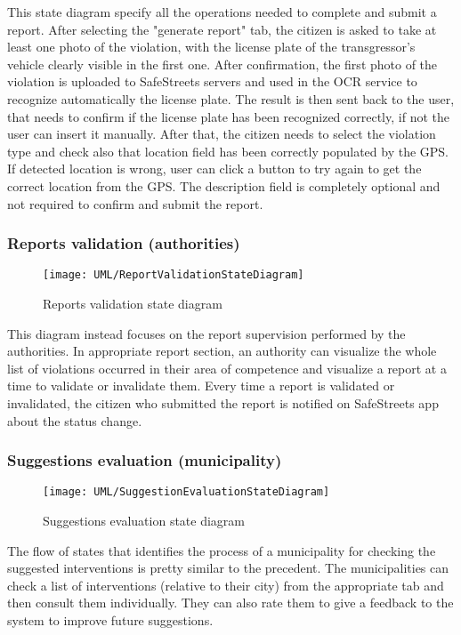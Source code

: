 This state diagram specify all the operations needed to complete and submit a report. After selecting the "generate report" tab, the citizen is asked to take at least one photo of the violation, with the license plate of the transgressor's vehicle clearly visible in the first one. After confirmation, the first photo of the violation is uploaded to SafeStreets servers and used in the OCR service to recognize automatically the license plate. The result is then sent back to the user, that needs to confirm if the license plate has been recognized correctly, if not the user can insert it manually. After that, the citizen needs to select the violation type and check also that location field has been correctly populated by the GPS. If detected location is wrong, user can click a button to try again to get the correct location from the GPS. The description field is completely optional and not required to confirm and submit the report.

\subsubsection{Reports validation (authorities)}

\begin{figure}[H]
	\centering
	\texttt{[image: UML/ReportValidationStateDiagram]}
	\caption{Reports validation state diagram}
\end{figure}

This diagram instead focuses on the report supervision performed by the authorities. In appropriate report section, an authority can visualize the whole list of violations occurred in their area of competence and visualize a report at a time to validate or invalidate them. Every time a report is validated or invalidated, the citizen who submitted the report is notified on SafeStreets app about the status change.

\subsubsection{Suggestions evaluation (municipality)}

\begin{figure}[H]
	\centering
	\texttt{[image: UML/SuggestionEvaluationStateDiagram]}
	\caption{Suggestions evaluation state diagram}
\end{figure}

The flow of states that identifies the process of a municipality for checking the suggested interventions is pretty similar to the precedent. The municipalities can check a list of interventions (relative to their city) from the appropriate tab and then consult them individually. They can also rate them to give a feedback to the system to improve future suggestions.

